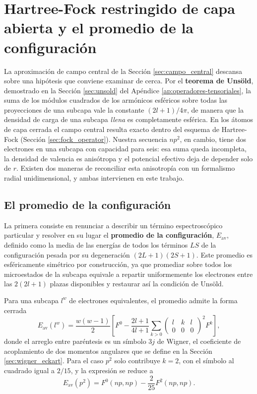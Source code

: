 \section{Hartree-Fock restringido de capa abierta y el promedio de la configuración}
\label{sec:rohf}

La aproximación de campo central de la Sección \ref{sec:campo_central} descansa sobre una hipótesis que conviene examinar de cerca. Por el \textbf{teorema de Unsöld}, demostrado en la Sección \ref{sec:unsold} del Apéndice \ref{ap:operadores-tensoriales}, la suma de los módulos cuadrados de los armónicos esféricos sobre todas las proyecciones de una subcapa vale la constante $(2l+1)/4\pi$, de manera que la densidad de carga de una subcapa \textit{llena} es completamente esférica. En los átomos de capa cerrada el campo central resulta exacto dentro del esquema de Hartree-Fock (Sección \ref{sec:fock_operator}). Nuestra secuencia $np^2$, en cambio, tiene dos electrones en una subcapa con capacidad para seis: esa suma queda incompleta, la densidad de valencia es anisótropa y el potencial efectivo deja de depender solo de $r$. Existen dos maneras de reconciliar esta anisotropía con un formalismo radial unidimensional, y ambas intervienen en este trabajo.

\subsection{El promedio de la configuración}

La primera consiste en renunciar a describir un término espectroscópico particular y resolver en su lugar el \textbf{promedio de la configuración}, $E_{\text{av}}$, definido como la media de las energías de todos los términos $LS$ de la configuración pesada por su degeneración $(2L+1)(2S+1)$. Este promedio es esféricamente simétrico por construcción, ya que promediar sobre todos los microestados de la subcapa equivale a repartir uniformemente los electrones entre las $2(2l+1)$ plazas disponibles y restaurar así la condición de Unsöld.

Para una subcapa $l^w$ de electrones equivalentes, el promedio admite la forma cerrada \parencite{Cowan1981}
\begin{equation}
    \label{eq:e_av_general}
    E_{\text{av}}(l^w) = \frac{w(w-1)}{2}\left[ F^0 - \frac{2l+1}{4l+1} \sum_{k>0} \begin{pmatrix} l & k & l \\ 0 & 0 & 0 \end{pmatrix}^2 F^k \right],
\end{equation}
donde el arreglo entre paréntesis es un símbolo $3j$ de Wigner, el coeficiente de acoplamiento de dos momentos angulares que se define en la Sección \ref{sec:wigner_eckart}. Para el caso $p^2$ solo contribuye $k=2$, con el símbolo al cuadrado igual a $2/15$, y la expresión se reduce a
\begin{equation}
    \label{eq:e_av_p2}
    E_{\text{av}}(p^2) = F^0(np,np) - \frac{2}{25}F^2(np,np).
\end{equation}

